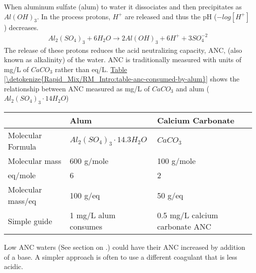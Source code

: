 \documentclass[letterpaper,10pt,english]{sphinxmanual}
\begin{document}
When aluminum sulfate (alum) to water it dissociates and then precipitates as \(Al(OH)_3\). In the process protons, \(H^+\) are released and thus the pH (\(-log[H^+]\)) decreases.
\begin{equation}\label{equation:Rapid_Mix/RM_Intro:Rapid_Mix/RM_Intro:0}
\begin{split}Al_2(SO_4)_3 + 6H_2O\rightarrow 2Al(OH)_3 + 6H^+ + 3SO_4^{-2}\end{split}
\end{equation}
The release of these protons reduces the acid neutralizing capacity, ANC, (also known as alkalinity) of the water. ANC is traditionally measured with units of mg/L of \(CaCO_3\) rather than eq/L.  \hyperref[\detokenize{Rapid_Mix/RM_Intro:table-anc-consumed-by-alum}]{Table \ref{\detokenize{Rapid_Mix/RM_Intro:table-anc-consumed-by-alum}}} shows the relationship between ANC measured as mg/L of \(CaCO_3\) and alum (\(Al_2(SO_4)_3 \cdot 14H_2O\))


\begin{savenotes}\sphinxattablestart
\raggedright
{}
\label{\detokenize{Rapid_Mix/RM_Intro:id3}}\label{\detokenize{Rapid_Mix/RM_Intro:table-anc-consumed-by-alum}}
\sphinxaftercaption
\begin{tabulary}{\linewidth}[t]{|T|T|T|}
\hline
\sphinxstyletheadfamily &\sphinxstyletheadfamily 
Alum
&\sphinxstyletheadfamily 
Calcium Carbonate
\\
\hline
Molecular Formula
&
\(Al_2(SO_4)_3 \cdot 14.3H_2O\)
&
\(CaCO_3\)
\\
\hline
Molecular mass
&
600 g/mole
&
100 g/mole
\\
\hline
eq/mole
&
6
&
2
\\
\hline
Molecular mass/eq
&
100 g/eq
&
50 g/eq
\\
\hline
Simple guide
&
1 mg/L alum consumes
&
0.5 mg/L calcium carbonate ANC
\\
\hline
\end{tabulary}
\par
\sphinxattableend\end{savenotes}

Low ANC waters (See section on {\hyperref[\detokenize{Rapid_Mix/RM_Intro:heading-buffering-capacity-of-natural-waters}]{}}.) could have their ANC increased by addition of a base. A simpler approach is often to use a different coagulant that is less acidic.
\end{document}
